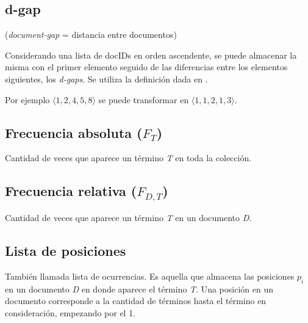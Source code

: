\subsection{d-gap}
\noindent(\textit{document-gap} = distancia entre documentos)

Considerando una lista de docIDs en orden ascendente, se puede almacenar la misma con el primer elemento seguido de las diferencias entre los elementos siguientes, los \textit{d-gaps}. Se utiliza la definición dada en \citet[p.~115]{WittenMoffatBell99}.

Por ejemplo $\langle 1, 2, 4 , 5 , 8 \rangle$ se puede transformar en $\langle 1, 1, 2 , 1 , 3 \rangle$.




\subsection{Frecuencia absoluta (\texorpdfstring{$F_{T}$}{FF})}

Cantidad de veces que aparece un término \textit{T} en toda la colección.


\subsection{Frecuencia relativa (\texorpdfstring{$F_{D,T}$}{FFD})}

Cantidad de veces que aparece un término \textit{T} en un documento \textit{D}.

\subsection{Lista de posiciones}

También llamada lista de ocurrencias. Es aquella que almacena las posiciones $p_i$ en un documento \textit{D} en donde aparece el término \textit{T}. Una posición en un documento corresponde a la cantidad de términos hasta el término en consideración, empezando por el 1.